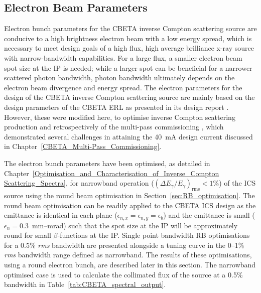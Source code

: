 \documentclass[../main.tex]{subfiles}
\begin{document}
\subsection{Electron Beam Parameters}
\label{sec:CBETA_ICS_electron_parameters}

Electron bunch parameters for the CBETA inverse Compton scattering source are conducive to a high brightness electron beam with a low energy spread, which is necessary to meet design goals of a high flux, high average brilliance x-ray source with narrow-bandwidth capabilities. For a large flux, a smaller electron beam spot size at the IP is needed; while a larger spot can be beneficial for a narrower scattered photon bandwidth, photon bandwidth ultimately depends on the electron beam divergence and energy spread. The electron parameters for the design of the CBETA inverse Compton scattering source are mainly based on the design parameters of the CBETA ERL as presented in its design report \cite{hoffstaetter2017cbeta}. However, these were modified here, to optimise inverse Compton scattering production and retrospectively of the multi-pass commissioning \cite{bartnik2020cbeta}, which demonstrated several challenges in attaining the 40~\si{\milli\ampere} design current discussed in Chapter~\ref{CBETA_Multi-Pass_Commissioning}. 

The electron bunch parameters have been optimised, as detailed in Chapter~\ref{Optimisation_and_Characterisation_of_Inverse_Compton Scattering_Spectra}, for narrowband operation ($\left(\Delta E_{\gamma}/E_{\gamma}\right)_{\mathrm{rms}} < 1\%$) of the ICS source using the round beam optimisation in Section~\ref{sec:RB_optimisation}. The round beam optimisation can be readily applied to the CBETA ICS design as the emittance is identical in each plane ($\epsilon_{n,x}=\epsilon_{n,y}=\epsilon_{b}$) and the emittance is small ($\epsilon_{n}=0.3$~\si{\milli\meter}--\si{\milli\radian}) such that the spot size at the IP will be approximately round for small $\beta$-functions at the IP. Single point bandwidth RB optimisations for a 0.5\% \textit{rms} bandwidth are presented alongside a tuning curve in the 0--1\% \textit{rms} bandwidth range defined as narrowband. The results of these optimisations, using a round electron bunch, are described later in this section. The narrowband optimised case is used to calculate the collimated flux of the source at a 0.5\% bandwidth in Table~\ref{tab:CBETA_spectral_output}.
\end{document}
